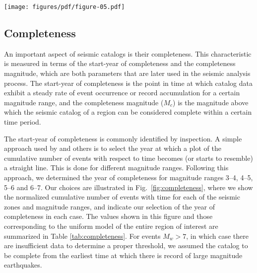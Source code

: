 
\begin{figure*}[t]
    \centering
    \texttt{[image: figures/pdf/figure-05.pdf]}
    \caption{Normalized cumulative number of events and completeness year thresholds for each of the seismic zones considered within the region of interest, and for magnitude intervals of $\Delta M = 1$ between $M_w$ 3 and 7. The year thresholds are indicated by a triangle mark at the top and the vertical dashed lines in the background. Normalization values for each curve are indicated on the right margins and distinguished by color as indicated in the legend.}
    \label{fig:completeness}
\end{figure*}

\subsection{Completeness}

An important aspect of seismic catalogs is their completeness. This characteristic is measured in terms of the start-year of completeness and the completeness magnitude, which are both parameters that are later used in the seismic analysis process. The start-year of completeness is the point in time at which catalog data exhibit a steady rate of event occurrence or record accumulation for a certain magnitude range, and the completeness magnitude ($M_c$) is the magnitude above which the seismic catalog of a region can be considered complete within a certain time period. 

The start-year of completeness is commonly identified by inspection. A simple approach used by \citet{Frankel1995} and others is to select the year at which a plot of the cumulative number of events with respect to time becomes (or starts to resemble) a straight line. This is done for different magnitude ranges. Following this approach, we determined the year of completeness for magnitude ranges 3--4, 4--5, 5--6 and 6--7. Our choices are illustrated in Fig.~\ref{fig:completeness}, where we show the normalized cumulative number of events with time for each of the seismic zones and magnitude ranges, and indicate our selection of the year of completeness in each case. The values shown in this figure and those corresponding to the uniform model of the entire region of interest are summarized in Table \ref{tab:completeness}. For events $M_w>7$, in which case there are insufficient data to determine a proper threshold, we assumed the catalog to be complete from the earliest time at which there is record of large magnitude earthquakes.

